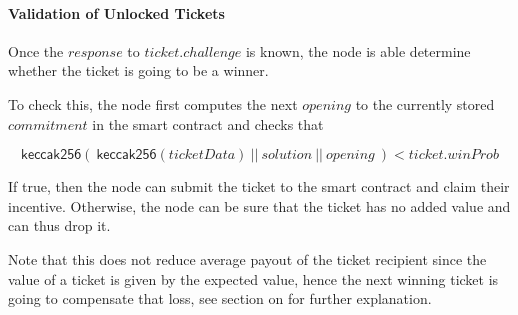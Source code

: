 \paragraph{Validation of Unlocked Tickets} Once the $response$ to $ticket.challenge$ is known, the node is able determine whether the ticket is going to be a winner.

To check this, the node first computes the next $opening$ to the currently stored $commitment$ in the smart contract and checks that

$$ \mathsf{keccak256} ( \ \mathsf{keccak256}(ticketData) \ || \ solution \ || \ opening \ ) < ticket.winProb $$

If true, then the node can submit the ticket to the smart contract and claim their incentive. Otherwise, the node can be sure that the ticket has no added value and can thus drop it.

Note that this does not reduce average payout of the ticket recipient since the value of a ticket is given by the expected value, hence the next winning ticket is going to compensate that loss, see section on  for further explanation.